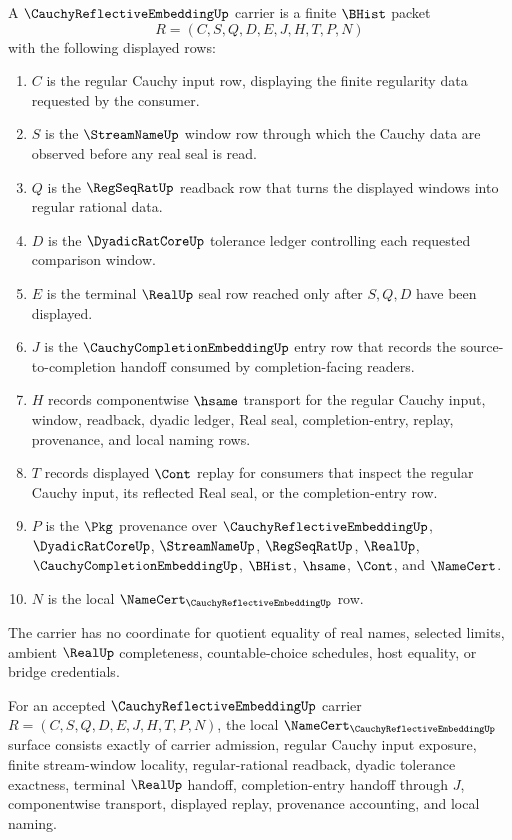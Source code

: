 \begin{definition}
\label{def:cauchy-reflective-embedding-carrier}
A $\CauchyReflectiveEmbeddingUp$ carrier is a finite $\BHist$ packet
$$
R=(C,S,Q,D,E,J,H,T,P,N)
$$
with the following displayed rows:
\begin{enumerate}
\item $C$ is the regular Cauchy input row, displaying the finite regularity data requested by the consumer.
\item $S$ is the $\StreamNameUp$ window row through which the Cauchy data are observed before any real seal is read.
\item $Q$ is the $\RegSeqRatUp$ readback row that turns the displayed windows into regular rational data.
\item $D$ is the $\DyadicRatCoreUp$ tolerance ledger controlling each requested comparison window.
\item $E$ is the terminal $\RealUp$ seal row reached only after $S,Q,D$ have been displayed.
\item $J$ is the $\CauchyCompletionEmbeddingUp$ entry row that records the source-to-completion handoff consumed by completion-facing readers.
\item $H$ records componentwise $\hsame$ transport for the regular Cauchy input, window, readback, dyadic ledger, Real seal, completion-entry, replay, provenance, and local naming rows.
\item $T$ records displayed $\Cont$ replay for consumers that inspect the regular Cauchy input, its reflected Real seal, or the completion-entry row.
\item $P$ is the $\Pkg$ provenance over $\CauchyReflectiveEmbeddingUp$, $\DyadicRatCoreUp$, $\StreamNameUp$, $\RegSeqRatUp$, $\RealUp$, $\CauchyCompletionEmbeddingUp$, $\BHist$, $\hsame$, $\Cont$, and $\NameCert$.
\item $N$ is the local $\NameCert_{\CauchyReflectiveEmbeddingUp}$ row.
\end{enumerate}
The carrier has no coordinate for quotient equality of real names, selected limits, ambient $\RealUp$ completeness, countable-choice schedules, host equality, or bridge credentials.
\end{definition}
\begin{theorem}
\label{thm:cauchy-reflective-embedding-namecert-obligations}
For an accepted $\CauchyReflectiveEmbeddingUp$ carrier $R=(C,S,Q,D,E,J,H,T,P,N)$, the local $\NameCert_{\CauchyReflectiveEmbeddingUp}$ surface consists exactly of carrier admission, regular Cauchy input exposure, finite stream-window locality, regular-rational readback, dyadic tolerance exactness, terminal $\RealUp$ handoff, completion-entry handoff through $J$, componentwise transport, displayed replay, provenance accounting, and local naming.
\end{theorem}
